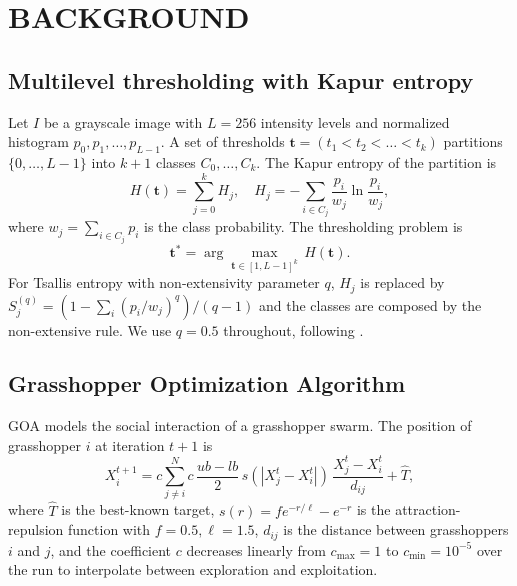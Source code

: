 \section{BACKGROUND}\label{sec:background}

\subsection{Multilevel thresholding with Kapur entropy}

Let $I$ be a grayscale image with $L{=}256$ intensity levels and normalized histogram $p_0,p_1,\dots,p_{L-1}$. A set of thresholds $\mathbf{t}{=}(t_1{<}t_2{<}\dots{<}t_k)$ partitions $\{0,\dots,L{-}1\}$ into $k{+}1$ classes $C_0,\dots,C_k$. The Kapur entropy of the partition is
\begin{equation}\label{eq:kapur}
H(\mathbf{t}) = \sum_{j=0}^{k} H_j,\quad H_j = -\sum_{i \in C_j} \frac{p_i}{w_j}\ln\frac{p_i}{w_j},
\end{equation}
where $w_j{=}\sum_{i\in C_j} p_i$ is the class probability. The thresholding problem is
\begin{equation}\label{eq:obj}
\mathbf{t}^* = \arg\max_{\mathbf{t}\in[1,L{-}1]^k}\, H(\mathbf{t}).
\end{equation}
For Tsallis entropy with non-extensivity parameter $q$, $H_j$ is replaced by $S_j^{(q)}{=}(1{-}\sum_i (p_i/w_j)^q)/(q{-}1)$ and the classes are composed by the non-extensive rule. We use $q{=}0.5$ throughout, following \cite{deAlbuquerque2004}.

\subsection{Grasshopper Optimization Algorithm}

GOA \cite{saremi2017goa} models the social interaction of a grasshopper swarm. The position of grasshopper $i$ at iteration $t{+}1$ is
\begin{equation}\label{eq:goa}
X_i^{t+1} = c \sum_{j\neq i}^{N} c\,\frac{ub-lb}{2}\,s(|X_j^t - X_i^t|)\,\frac{X_j^t - X_i^t}{d_{ij}} + \hat{T},
\end{equation}
where $\hat{T}$ is the best-known target, $s(r){=}f e^{-r/\ell}{-}e^{-r}$ is the attraction-repulsion function with $f{=}0.5,\ell{=}1.5$, $d_{ij}$ is the distance between grasshoppers $i$ and $j$, and the coefficient $c$ decreases linearly from $c_{\max}{=}1$ to $c_{\min}{=}10^{-5}$ over the run to interpolate between exploration and exploitation.

